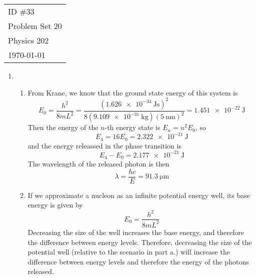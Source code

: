 \documentclass[fleqn]{article}[12pt]
\begin{document}
    \begin{tabular}{l}
        ID \#33 \\
        Problem Set 20 \\
        Physics 202 \\
        \today
    \end{tabular}

\begin{enumerate}
    \item \begin{enumerate}
        \item From Krane, we know that the ground state energy of this system is
        \begin{equation*}
            E_0 = \frac{h^2}{8mL^2} = \frac{(\SI{1.626e-34}{\joule\s})^2}{8(\SI{9.109e-31}{\kg})(\SI{5}{\nano\meter})^2} = \SI{1.451e-22}{\joule}
        \end{equation*}
        Then the energy of the $n$-th energy state is $E_n = n^2E_0$, so
        \begin{equation*}
            E_4 = 16E_0 = \SI{2.322e-21}{\joule}
        \end{equation*}
        and the energy releassed in the phase transition is
        \begin{equation*}
            E_4-E_0 = \SI{2.177e-21}{\joule}
        \end{equation*}
        The wavelength of the released photon is then
        \begin{equation*}
            \lambda = \frac{hc}{E} = \SI{91.3}{\um}
        \end{equation*}

        \item If we approximate a nucleon as an infinite potential energy well, its base energy is given by
        \begin{equation*}
            E_0 = \frac{h^2}{8m L^2}
        \end{equation*}
        Decreasing the size of the well increases the base energy, and therefore the difference between energy levels. Therefore, decreasing the size of the potential well (relative to the scenario in part a.) will increase the difference between energy levels and therefore the energy of the photons released.
    \end{enumerate}


\end{enumerate}
\end{document}
